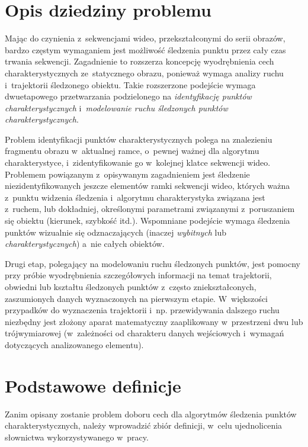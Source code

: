   \section{Opis dziedziny problemu}\label{Section_Problematyka}

    Mając do czynienia z~sekwencjami wideo, przekształconymi do serii obrazów, bardzo częstym wymaganiem jest możliwość śledzenia punktu przez cały czas trwania sekwencji. Zagadnienie to rozszerza koncepcję wyodrębnienia cech charakterystycznych ze~statycznego obrazu, ponieważ wymaga analizy ruchu i~trajektorii śledzonego obiektu. Takie rozszerzone podejście wymaga dwuetapowego przetwarzania podzielonego na \textit{identyfikację punktów charakterystycznych} i~\textit{modelowanie ruchu śledzonych punktów charakterystycznych}.

    Problem identyfikacji punktów charakterystycznych polega na znalezieniu fragmentu obrazu w~aktualnej ramce, o~pewnej ważnej dla algorytmu charakterystyce, i~zidentyfikowanie go w~kolejnej klatce sekwencji wideo. Problemem powiązanym z~opisywanym zagadnieniem jest śledzenie niezidentyfikowanych jeszcze elementów ramki sekwencji wideo, których ważna z~punktu widzenia śledzenia i~algorytmu charakterystyka związana jest z~ruchem, lub dokładniej, określonymi parametrami związanymi z~poruszaniem się obiektu (kierunek, szybkość itd.). Wspomniane podejście wymaga śledzenia punktów wizualnie się odznaczających (inaczej \textit{wybitnych} lub \textit{charakterystycznych}) a~nie całych obiektów.

    Drugi etap, polegający na modelowaniu ruchu śledzonych punktów, jest pomocny przy próbie wyodrębnienia szczegółowych informacji na temat trajektorii, obwiedni lub kształtu śledzonych punktów z~często zniekształconych, zaszumionych danych wyznaczonych na pierwszym etapie. W~większości przypadków do wyznaczenia trajektorii i~np. przewidywania dalszego ruchu niezbędny jest złożony aparat matematyczny zaaplikowany w~przestrzeni dwu lub trójwymiarowej (w~zależności od charakteru danych wejściowych i~wymagań dotyczących analizowanego elementu).

  \section{Podstawowe definicje}\label{Section_Definicje}

    Zanim opisany zostanie problem doboru cech dla algorytmów śledzenia punktów charakterystycznych, należy wprowadzić zbiór definicji, w~celu ujednolicenia słownictwa wykorzystywanego w~pracy.

